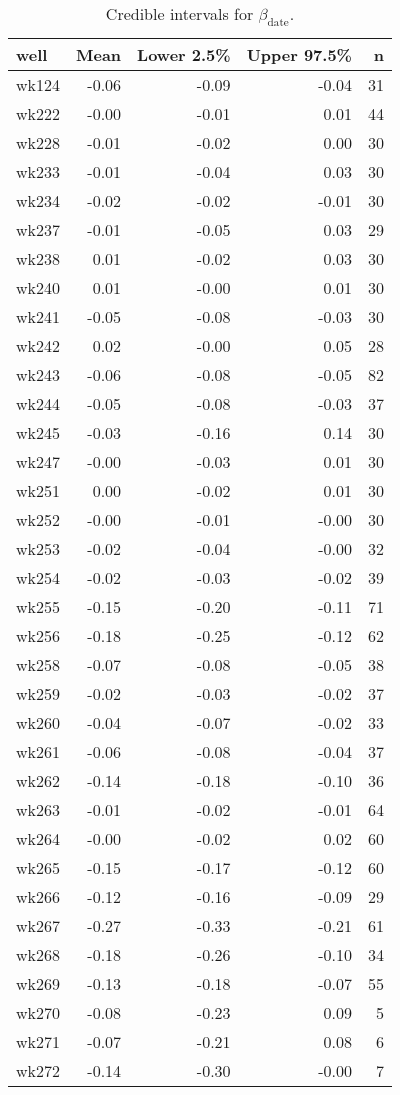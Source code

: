 \begin{table}[ht]
\centering
\begin{tabular}{lrrrr}
  \hline
well & Mean & Lower 2.5\% & Upper 97.5\% & n \\ 
  \hline
wk124 & -0.06 & -0.09 & -0.04 &  31 \\ 
  wk222 & -0.00 & -0.01 & 0.01 &  44 \\ 
  wk228 & -0.01 & -0.02 & 0.00 &  30 \\ 
  wk233 & -0.01 & -0.04 & 0.03 &  30 \\ 
  wk234 & -0.02 & -0.02 & -0.01 &  30 \\ 
  wk237 & -0.01 & -0.05 & 0.03 &  29 \\ 
  wk238 & 0.01 & -0.02 & 0.03 &  30 \\ 
  wk240 & 0.01 & -0.00 & 0.01 &  30 \\ 
  wk241 & -0.05 & -0.08 & -0.03 &  30 \\ 
  wk242 & 0.02 & -0.00 & 0.05 &  28 \\ 
  wk243 & -0.06 & -0.08 & -0.05 &  82 \\ 
  wk244 & -0.05 & -0.08 & -0.03 &  37 \\ 
  wk245 & -0.03 & -0.16 & 0.14 &  30 \\ 
  wk247 & -0.00 & -0.03 & 0.01 &  30 \\ 
  wk251 & 0.00 & -0.02 & 0.01 &  30 \\ 
  wk252 & -0.00 & -0.01 & -0.00 &  30 \\ 
  wk253 & -0.02 & -0.04 & -0.00 &  32 \\ 
  wk254 & -0.02 & -0.03 & -0.02 &  39 \\ 
  wk255 & -0.15 & -0.20 & -0.11 &  71 \\ 
  wk256 & -0.18 & -0.25 & -0.12 &  62 \\ 
  wk258 & -0.07 & -0.08 & -0.05 &  38 \\ 
  wk259 & -0.02 & -0.03 & -0.02 &  37 \\ 
  wk260 & -0.04 & -0.07 & -0.02 &  33 \\ 
  wk261 & -0.06 & -0.08 & -0.04 &  37 \\ 
  wk262 & -0.14 & -0.18 & -0.10 &  36 \\ 
  wk263 & -0.01 & -0.02 & -0.01 &  64 \\ 
  wk264 & -0.00 & -0.02 & 0.02 &  60 \\ 
  wk265 & -0.15 & -0.17 & -0.12 &  60 \\ 
  wk266 & -0.12 & -0.16 & -0.09 &  29 \\ 
  wk267 & -0.27 & -0.33 & -0.21 &  61 \\ 
  wk268 & -0.18 & -0.26 & -0.10 &  34 \\ 
  wk269 & -0.13 & -0.18 & -0.07 &  55 \\ 
  wk270 & -0.08 & -0.23 & 0.09 &   5 \\ 
  wk271 & -0.07 & -0.21 & 0.08 &   6 \\ 
  wk272 & -0.14 & -0.30 & -0.00 &   7 \\ 
   \hline
\end{tabular}
\caption{Credible intervals for $\beta_\text{date}$.} 
\label{tab:beta_date_all}
\end{table}
